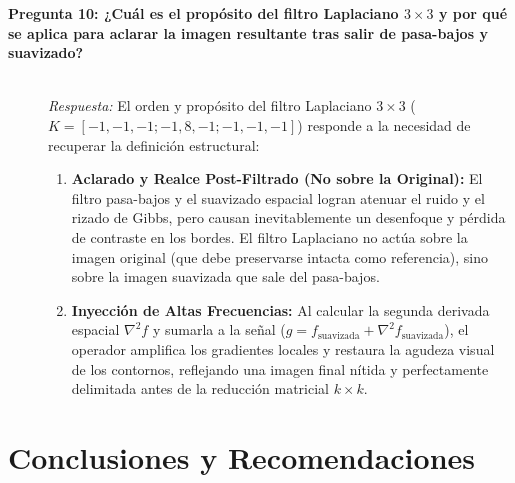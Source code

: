 \documentclass{article}
\begin{document}
\begin{description}
    \item[\textbf{Pregunta 10: ¿Cuál es el propósito del filtro Laplaciano $3\times3$ y por qué se aplica para aclarar la imagen resultante tras salir de pasa-bajos y suavizado?}]~\\
    \textit{Respuesta:} El orden y propósito del filtro Laplaciano $3\times3$ ($K = [-1,-1,-1; -1,8,-1; -1,-1,-1]$) responde a la necesidad de recuperar la definición estructural:
    \begin{enumerate}
        \item \textbf{Aclarado y Realce Post-Filtrado (No sobre la Original):} El filtro pasa-bajos y el suavizado espacial logran atenuar el ruido y el rizado de Gibbs, pero causan inevitablemente un desenfoque y pérdida de contraste en los bordes. El filtro Laplaciano no actúa sobre la imagen original (que debe preservarse intacta como referencia), sino sobre la imagen suavizada que sale del pasa-bajos.
        \item \textbf{Inyección de Altas Frecuencias:} Al calcular la segunda derivada espacial $\nabla^2 f$ y sumarla a la señal ($g = f_{\text{suavizada}} + \nabla^2 f_{\text{suavizada}}$), el operador amplifica los gradientes locales y restaura la agudeza visual de los contornos, reflejando una imagen final nítida y perfectamente delimitada antes de la reducción matricial $k \times k$.
    \end{enumerate}
\end{description}


\section{Conclusiones y Recomendaciones}
\end{document}
